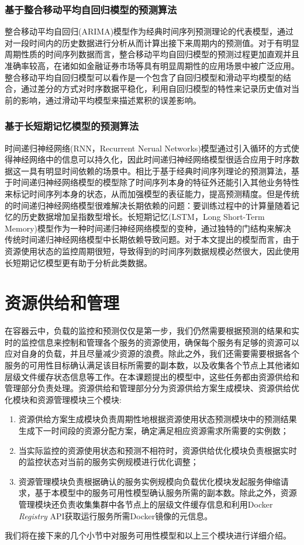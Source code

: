 \subsubsection{基于整合移动平均自回归模型的预测算法}
整合移动平均自回归(ARIMA)模型作为经典时间序列预测理论的代表模型，通过对一段时间内的历史数据进行分析从而计算出接下来周期内的预测值。对于有明显周期性质的时间序列数据而言，整合移动平均自回归模型的预测过程更加直观并且准确率较高，在诸如如金融证券市场等具有明显周期性的应用场景中被广泛应用。整合移动平均自回归模型可以看作是一个包含了自回归模型和滑动平均模型的结合，通过差分的方式对时序数据平稳化，利用自回归模型的特性来记录历史值对当前的影响，通过滑动平均模型来描述累积的误差影响。

\subsubsection{基于长短期记忆模型的预测算法}
时间递归神经网络(RNN，Recurrent Nerual Networks)模型通过引入循环的方式使得神经网络中的信息可以持久化\cite{graves2012supervised}，因此时间递归神经网络模型很适合应用于时序数据这一具有明显时间依赖的场景中。相比于基于经典时间序列理论的预测算法，基于时间递归神经网络模型的模型除了时间序列本身的特征外还能引入其他业务特性来标记时间序列本身的状态，从而加强模型的表征能力，提高预测精度。但是传统的时间递归神经网络模型很难解决长期依赖的问题：要训练过程中的计算量随着记忆的历史数据增加呈指数型增长\cite{bengio1994learning}。长短期记忆(LSTM，Long Short-Term Memory)模型作为一种时间递归神经网络模型的变种，通过独特的门结构来解决传统时间递归神经网络模型中长期依赖导致问题。对于本文提出的模型而言，由于资源使用状态的监控周期很短，导致得到的时间序列数据规模必然很大，因此使用长短期记忆模型更有助于分析此类数据。

\section{资源供给和管理}
在容器云中，负载的监控和预测仅仅是第一步，我们仍然需要根据预测的结果和实时的监控信息来控制和管理各个服务的资源使用，确保每个服务有足够的资源可以应对自身的负载，并且尽量减少资源的浪费。除此之外，我们还需要需要根据各个服务的可用性目标确认满足该目标所需要的副本数，以及收集各个节点上其他诸如层级文件缓存状态信息等工作。在本课题提出的模型中，这些任务都由资源供给和管理部分负责处理。资源供给和管理部分分为资源供给方案生成模块、资源供给优化模块和资源管理模块三个模块:
\begin{enumerate}
\item 资源供给方案生成模块负责周期性地根据资源使用状态预测模块中的预测结果生成下一时间段的资源分配方案，确定满足相应资源需求所需要的实例数；
\item 当实际监控的资源使用状态和预测不相符时，资源供给优化模块负责根据实时的监控状态对当前的服务实例规模进行优化调整；
\item 资源管理模块负责根据确认的服务实例规模向负载优化模块发起服务伸缩请求，基于本模型中的服务可用性模型确认服务所需的副本数。除此之外，资源管理模块还负责收集集群中各节点上的层级文件缓存信息和利用Docker \emph{Registry} API获取运行服务所需Docker镜像的元信息。
\end{enumerate}
我们将在接下来的几个小节中对服务可用性模型和以上三个模块进行详细介绍。

